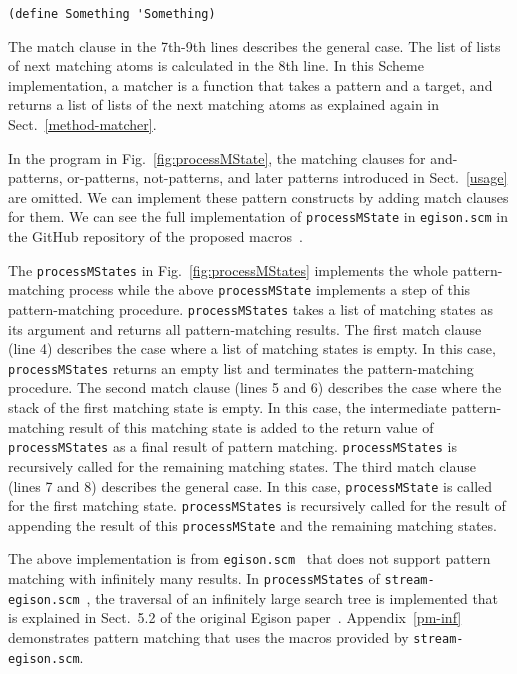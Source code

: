 \documentclass[acmlarge]{acmart}
\begin{document}
\begin{lstlisting}[language=egison]
(define Something 'Something)
\end{lstlisting}


The match clause in the 7th-9th lines describes the general case.
The list of lists of next matching atoms is calculated in the 8th line.
In this Scheme implementation, a matcher is a function that takes a pattern and a target, and returns a list of lists of the next matching atoms as explained again in Sect.~\ref{method-matcher}.

In the program in Fig.~\ref{fig:processMState}, the matching clauses for and-patterns, or-patterns, not-patterns, and later patterns introduced in Sect.~\ref{usage} are omitted.
We can implement these pattern constructs by adding match clauses for them.
We can see the full implementation of \lstinline{processMState} in \texttt{egison.scm} in the GitHub repository of the proposed macros~\cite{egisonScheme}.

\medskip

The \lstinline{processMStates} in Fig.~\ref{fig:processMStates} implements the whole pattern-matching process while the above \lstinline{processMState} implements a step of this pattern-matching procedure.
\lstinline{processMStates} takes a list of matching states as its argument and returns all pattern-matching results.
The first match clause (line 4) describes the case where a list of matching states is empty.
In this case, \lstinline{processMStates} returns an empty list and terminates the pattern-matching procedure.
The second match clause (lines 5 and 6) describes the case where the stack of the first matching state is empty.
In this case, the intermediate pattern-matching result of this matching state is added to the return value of \lstinline{processMStates} as a final result of pattern matching.
\lstinline{processMStates} is recursively called for the remaining matching states.
The third match clause (lines 7 and 8) describes the general case.
In this case, \lstinline{processMState} is called for the first matching state.
\lstinline{processMStates} is recursively called for the result of appending the result of this \lstinline{processMState} and the remaining matching states.

The above implementation is from \texttt{egison.scm}~\cite{egisonScheme} that does not support pattern matching with infinitely many results.
In \lstinline{processMStates} of \texttt{stream-egison.scm}~\cite{egisonScheme}, the traversal of an infinitely large search tree is implemented that is explained in Sect.~5.2 of the original Egison paper~\cite{egi2018aplas}.
Appendix~\ref{pm-inf} demonstrates pattern matching that uses the macros provided by \texttt{stream-egison.scm}.
\end{document}
